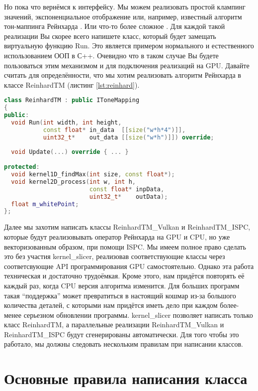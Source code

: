 \documentclass[11pt,fleqn,english,russian]{report} %
\begin{document}
Но пока что вернёмся к интерфейсу. Мы можем реализовать простой клампинг значений, экспоненциальное отображение или, например, известный алгоритм тон-маппинга Рейнхарда \cite{Reinhard05}. Или что-то более сложное \cite{Mantiuk08}. Для каждой такой реализации Вы скорее всего напишете класс, который будет замещать виртуальную функцию Run. Это является примером нормального и естественного использованием ООП в С++. Очевидно что в таком случае Вы будете пользоваться этим механизмом и для подключения реализаций на GPU. Давайте считать для определённости, что мы хотим реализовать алгоритм Рейнхарда в классе ReinhardTM (листинг \ref{lst:reinhard}).

\begin{lstlisting}[language=C++, 
	               caption=класс для алгоритма Рейнхарда, 
	               label=lst:reinhard]	
class ReinhardTM : public IToneMapping
{
public:
  void Run(int width, int height, 
           const float* in_data  [[size("w*h*4")]], 
           uint32_t*    out_data [[size("w*h")]]) override;
		   
  void Update(...) override { ... }
   	
protected:
  void kernel1D_findMax(int size, const float*);
  void kernel2D_process(int w, int h, 
                        const float* inpData, 
                        uint32_t*    outData);
  float m_whitePoint;
};
\end{lstlisting}

Далее мы захотим написать классы ReinhardTM\_Vulkan и ReinhardTM\_ISPC, которые будут реализовывать оператор Рейнхарда на GPU и CPU, но уже векторизованным образом, при помощи ISPC. Мы имеем полное право сделать это без участия kernel\_slicer, реализовав соответствующие классы через соответсвующие API программирования GPU самостоятельно. Однако эта работа техническая и достаточно трудоёмкая. Кроме этого, нам придётся повторять её каждый раз, когда CPU версия алгоритма изменится. Для больших программ такая ``поддержка'' может превратиться в настоящий кошмар из-за большого количества деталей, с которыми нам придётся иметь дело при каждом более-менее серьезном обновлении программы. kernel\_slicer позволяет написать только класс ReinhardTM, а параллельные реализации ReinhardTM\_Vulkan и ReinhardTM\_ISPC будут сгенерированы автоматически. Для того чтобы это работало, мы должны следовать нескольким правилам при написании классов.

\section{Основные правила написания класса}
\end{document}
